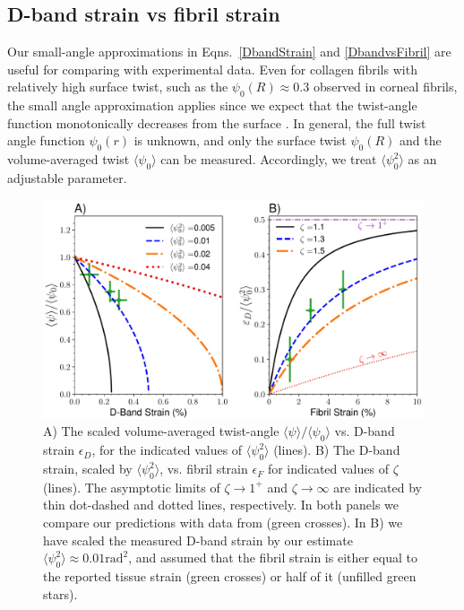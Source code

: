 \documentclass[preprint,12pt]{elsarticle}
\begin{document}
\subsection{D-band strain vs fibril strain}\label{cornealcompare}
Our small-angle approximations in Eqns.~\ref{DbandStrain} and \ref{DbandvsFibril} are useful for comparing with experimental data. Even for collagen fibrils with relatively high surface twist, such as the $\psi_0(R)\approx 0.3$ observed in corneal fibrils, the small angle approximation applies since we expect that the twist-angle function monotonically decreases from the surface \cite{Cameron:2020, Leighton:2021}. In general, the full twist angle function $\psi_0(r)$ is unknown, and only the surface twist $\psi_0(R)$ and the volume-averaged twist $\langle \psi_0\rangle$ can be measured. Accordingly, we treat $\langle\psi_0^2\rangle$ as an adjustable parameter.

\begin{figure}[h] 
\centering
  \includegraphics[width=\textwidth]{Figure_1.pdf}
  \caption{A) The scaled volume-averaged twist-angle $\langle\psi\rangle/\langle\psi_0\rangle$ vs. D-band strain $\epsilon_D$, for the indicated values of $\langle\psi_0^2\rangle$ (lines). B) The D-band strain, scaled by $\langle\psi_0^2\rangle$, vs. fibril strain $\epsilon_F$ for indicated values of $\zeta$ (lines). The asymptotic limits of $\zeta \rightarrow 1^+$ and $\zeta \rightarrow \infty$ are indicated by thin dot-dashed and dotted lines, respectively. In both panels we compare our predictions with data from \cite{Bell:2018} (green crosses). In B) we have scaled the measured D-band strain by our estimate $\langle\psi_0^2\rangle\approx0.01\mathrm{rad}^2$, and assumed that the fibril strain is either equal to the reported tissue strain (green crosses) or half of it (unfilled green stars).}
  \label{fig:dbandstrain}
\end{figure}
\end{document}
